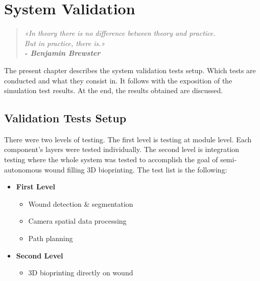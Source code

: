 \chapter{System Validation}
\label{cha:system_validation}

\begin{quotation}
\begin{flushright}
\itshape
«In theory there is no difference between theory and practice.\\ But in practice, there is.»\\
\textbf{- Benjamin Brewster}
\end{flushright}
\end{quotation}

The present chapter describes the system validation tests setup. Which tests are conducted and what they consist in. It follows with the exposition of the simulation test results. At the end, the results obtained are discussed.


\section{Validation Tests Setup}
\label{sec:system_validation_tests_setup}

There were two levels of testing. The first level is testing at module level. Each component's layers were tested individually. The second level is integration testing where the whole system was tested to accomplish the goal of semi-autonomous wound filling 3D bioprinting. The test list is the following:

\begin{itemize}
    \item \textbf{First Level}
    \begin{itemize}
        \item Wound detection \& segmentation
        \item Camera spatial data processing
        \item Path planning
    \end{itemize}
    \item \textbf{Second Level}
    \begin{itemize}
        \item 3D bioprinting directly on wound
    \end{itemize}
\end{itemize}

